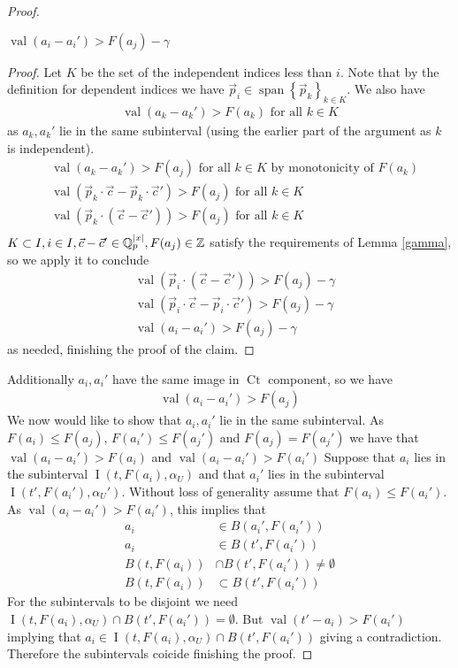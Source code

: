 \documentclass{amsart}
\newcommand{\curly}[1]{\left\{#1\right\}}
\DeclareMathOperator{\Ct}{Ct}
\DeclareMathOperator{\vecspan}{span}
\DeclareMathOperator{\val}{val}
\DeclareMathOperator{\inti}{I}
\begin{document}
\begin{proof}
  \begin{Claim}
    $\val(a_i - a_i') > F(a_j) - \gamma$
  \end{Claim}
  \begin{proof}
    Let $K$ be the set of the independent indices less than $i$.
    Note that by the definition for dependent indices we have $\vec p_i \in \vecspan \curly{\vec p_k}_{k \in K}$.
    We also have 
    \begin{align*}
      \val(a_k - a_k') > F(a_k) \text { for all } k \in K
    \end{align*}
    as $a_k, a_k'$ lie in the same subinterval (using the earlier part of the argument as $k$ is independent).
    \begin{align*}
      &\val(a_k - a_k') > F(a_j) \text { for all } k \in K \text{ by monotonicity of $F(a_k)$} \\
      &\val(\vec p_k \cdot \vec c - \vec p_k \cdot \vec c') > F(a_j) \text { for all } k \in K \\
      &\val(\vec p_k \cdot (\vec c - \vec c')) > F(a_j) \text { for all } k \in K \\
    \end{align*}
    $K \subset I, i \in I, \vec c - \vec c' \in \mathbb{Q}_p^{|x|}, F(a_j) \in \mathbb{Z}$
    satisfy the requirements of Lemma \ref {gamma}, so we apply it to conclude
    \begin{align*}
      &\val(\vec p_i \cdot (\vec c - \vec c')) > F(a_j) - \gamma \\
      &\val(\vec p_i \cdot \vec c - \vec p_i \cdot \vec c') > F(a_j) - \gamma \\
      &\val(a_i - a_i') > F(a_j) - \gamma
    \end{align*}
    as needed, finishing the proof of the claim.
  \end{proof}	
  Additionally $a_i, a_i'$ have the same image in $\Ct$ component, so we have
  \begin{align*}
    \val(a_i - a_i') > F(a_j) 
  \end{align*}
  We now would like to show that $a_i, a_i'$ lie in the same subinterval.
  As $F(a_i) \leq F(a_j)$, $F(a_i') \leq F(a_j')$ and $F(a_j) = F(a_j')$ we have that
  $\val(a_i - a_i') > F(a_i)$ and $\val(a_i - a_i') > F(a_i')$
  Suppose that $a_i$ lies in the subinterval $\inti(t, F(a_i), \alpha_U)$
  and that $a_i'$ lies in the subinterval $\inti(t', F(a_i'), \alpha_U')$.
  Without loss of generality assume that $F(a_i) \leq F(a_i')$.
  As $\val(a_i - a_i') > F(a_i')$, this implies that
  \begin{align*}
    a_i &\in B(a_i', F(a_i')) \\
    a_i &\in B(t', F(a_i')) \\
    B(t, F(a_i)) &\cap B(t', F(a_i')) \neq \emptyset \\
    B(t, F(a_i)) &\subset B(t', F(a_i')) 
  \end{align*}
  For the subintervals to be disjoint we need 
  $\inti(t, F(a_i), \alpha_U) \cap B(t', F(a_i')) = \emptyset$.
  But $\val(t' - a_i) > F(a_i')$ implying that $a_i \in \inti(t, F(a_i), \alpha_U) \cap B(t', F(a_i'))$ giving a contradiction.
  Therefore the subintervals coicide finishing the proof.
\end{proof}
\end{document}
